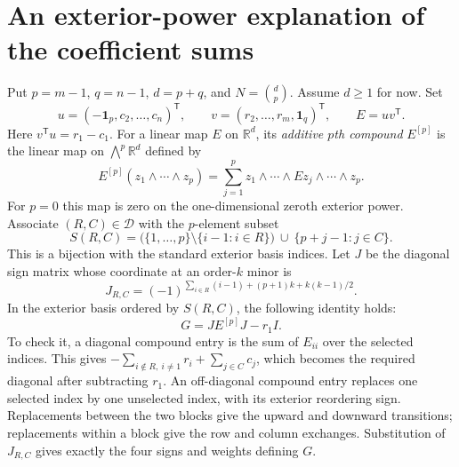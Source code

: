 \documentclass[11pt]{article}
\newcommand{\D}{\mathcal D}
\newcommand{\one}{\mathbf 1}
\begin{document}
\section{An exterior-power explanation of the coefficient sums}
Put $p=m-1$, $q=n-1$, $d=p+q$, and $N=\binom d p$. Assume $d\geq1$ for now. Set
\[
 u=(-\one_p,c_2,\ldots,c_n)^{\mathsf T},\qquad
 v=(r_2,\ldots,r_m,\one_q)^{\mathsf T},\qquad E=uv^{\mathsf T}.
\]
Here $v^{\mathsf T}u=r_1-c_1$. For a linear map $E$ on $\mathbb R^d$, its \emph{additive $p$th compound} $E^{[p]}$ is the linear map on $\bigwedge^p\mathbb R^d$ defined by
\[
 E^{[p]}(z_1\wedge\cdots\wedge z_p)
 =\sum_{j=1}^p z_1\wedge\cdots\wedge Ez_j\wedge\cdots\wedge z_p.
\]
For $p=0$ this map is zero on the one-dimensional zeroth exterior power. Associate $(R,C)\in\D$ with the $p$-element subset
\[
 S(R,C)=\bigl(\{1,\ldots,p\}\setminus\{i-1:i\in R\}\bigr)
 \ \cup\ \{p+j-1:j\in C\}.
\]
This is a bijection with the standard exterior basis indices. Let $J$ be the diagonal sign matrix whose coordinate at an order-$k$ minor is
\[
 J_{R,C}=(-1)^{\sum_{i\in R}(i-1)+(p+1)k+k(k-1)/2}.
\]
In the exterior basis ordered by $S(R,C)$, the following identity holds:
\begin{equation}\label{eq:compound}
 \boxed{\quad G=J E^{[p]}J-r_1I.\quad}
\end{equation}
To check it, a diagonal compound entry is the sum of $E_{ii}$ over the selected indices. This gives $-\sum_{i\notin R,\ i\ne1}r_i+\sum_{j\in C}c_j$, which becomes the required diagonal after subtracting $r_1$. An off-diagonal compound entry replaces one selected index by one unselected index, with its exterior reordering sign. Replacements between the two blocks give the upward and downward transitions; replacements within a block give the row and column exchanges. Substitution of $J_{R,C}$ gives exactly the four signs and weights defining $G$.
\end{document}
